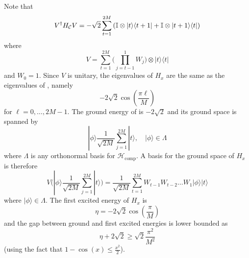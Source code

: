 \documentclass[../thesis-main/thesis-main]{subfiles}
\begin{document}
Note that 
\begin{equation}
  V^{\dagger}H_{\mathcal{C}}V=-\sqrt{2}\sum_{t=1}^{2M}\left(\mathbb{I}\otimes|t\rangle\langle t+1|+\mathbb{I}\otimes|t+1\rangle\langle t|\right)\label{eq:V_H_V}
\end{equation}
where 
\begin{equation}
  V=\sum_{t=1}^{2M}\bigg(\prod_{j=t-1}^{1}W_{j}\bigg)\otimes|t\rangle\langle t|
\end{equation}
and $W_{0}=1$. Since $V$ is unitary, the eigenvalues of $H_{x}$ are the same as the eigenvalues of , namely 
\begin{equation}
  -2\sqrt{2}\cos\left(\frac{\pi \ell}{M}\right)
\end{equation}
for $\ell=0,\ldots,2M-1$. The ground energy of  is $-2\sqrt{2}$ and its ground space is spanned by 
\begin{equation}
  |\phi\rangle\frac{1}{\sqrt{2M}}\sum_{j=1}^{2M}|t\rangle,
  \quad|\phi\rangle\in\Lambda
\end{equation}
where $\Lambda$ is any orthonormal basis for $\mathcal{H}_{\mathrm{comp}}$. A basis for the ground space of $H_{x}$ is therefore 
\begin{equation}
  V\bigg(|\phi\rangle\frac{1}{\sqrt{2M}}\sum_{j=1}^{2M}|t\rangle\bigg)=\frac{1}{\sqrt{2M}}\sum_{t=1}^{2M}W_{t-1}W_{t-2}\ldots W_{1}|\phi\rangle|t\rangle
\end{equation}
 where $|\phi\rangle\in\Lambda$. The first excited energy of $H_{x}$ is 
\begin{equation}
  \eta=-2\sqrt{2}\cos\left(\frac{\pi}{M}\right)
\end{equation}
and the gap between ground and first excited energies is lower bounded as 
\begin{equation}
  \eta+2\sqrt{2}\geq\sqrt{2}\frac{\pi^{2}}{M^{2}}\label{eq:bound_on_eta}
\end{equation}
(using the fact that $1-\cos(x)\leq\frac{x^{2}}{2}$).
\end{document}
